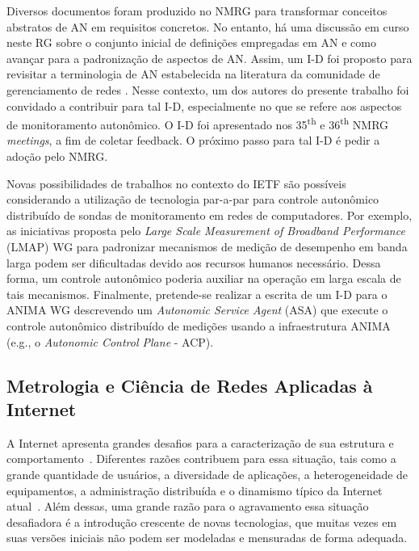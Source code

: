 \documentclass[12pt]{article}
\begin{document}

Diversos documentos foram produzido no NMRG para transformar conceitos abstratos de AN em requisitos concretos. No entanto, há uma discussão em curso neste RG sobre o conjunto inicial de definições empregadas em AN e como avançar para a padronização de aspectos de AN. Assim, um I-D foi proposto para revisitar a terminologia de AN estabelecida na literatura da comunidade de gerenciamento de redes \cite{NMRG-Pentikousis-2015}. Nesse contexto, um dos autores do presente trabalho foi convidado a contribuir para tal I-D, especialmente no que se refere aos aspectos de monitoramento autonômico. O I-D foi apresentado nos 35\textsuperscript{th} e 36\textsuperscript{th} NMRG \textit{meetings}, a fim de coletar feedback. O próximo passo para tal I-D é pedir a adoção pelo NMRG.


Novas possibilidades de trabalhos no contexto do IETF são possíveis considerando a utilização de tecnologia par-a-par para controle autonômico distribuído de sondas de monitoramento em redes de computadores. Por exemplo, as iniciativas proposta pelo \textit{Large Scale Measurement of Broadband Performance} (LMAP) WG para padronizar mecanismos de medição de desempenho em banda larga podem ser dificultadas devido aos recursos humanos necessário. Dessa forma, um controle autonômico poderia auxiliar na operação em larga escala de tais mecanismos. Finalmente, pretende-se realizar a escrita de um I-D para o ANIMA WG descrevendo um \textit{Autonomic Service Agent} (ASA) que execute o controle autonômico distribuído de medições usando a infraestrutura ANIMA (e.g., o \textit{Autonomic Control Plane} - ACP).

\subsection{Metrologia e Ciência de Redes Aplicadas à Internet}

A Internet apresenta grandes desafios para a caracterização de sua estrutura e comportamento~\cite{Chen2001}. Diferentes razões contribuem para essa situação, tais como a grande quantidade de usuários, a diversidade de aplicações, a heterogeneidade de equipamentos, a administração distribuída e o dinamismo típico da Internet atual~\cite{Wang2010}. Além dessas, uma grande razão para o agravamento essa situação desafiadora  é a introdução crescente de novas tecnologias, que muitas vezes em suas versões iniciais não podem ser modeladas e mensuradas de forma adequada. 
\end{document}
